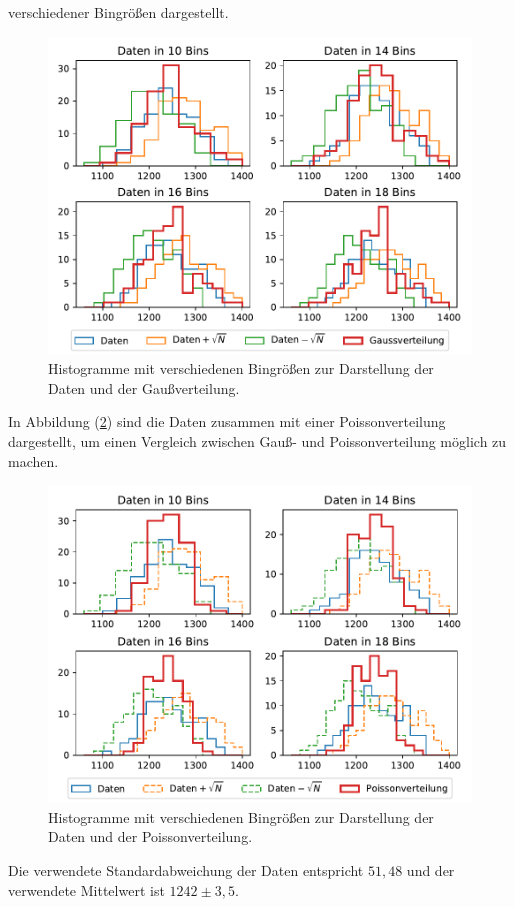 verschiedener Bingrößen dargestellt. 
\begin{figure}[H]
    \centering
    \includegraphics[width=\textwidth]{Plots/plot5.pdf}
    \caption{Histogramme mit verschiedenen Bingrößen zur Darstellung der Daten und der Gaußverteilung.}
    \label{fig:Gauss}
\end{figure}
In Abbildung (\ref{fig:Poisson}) sind die Daten zusammen mit einer Poissonverteilung dargestellt, um einen Vergleich zwischen Gauß- und Poissonverteilung möglich 
zu machen.
\begin{figure}[H]
    \centering
    \includegraphics[width=\textwidth]{Plots/plot6.pdf}
    \caption{Histogramme mit verschiedenen Bingrößen zur Darstellung der Daten und der Poissonverteilung.}
    \label{fig:Poisson}
\end{figure}
Die verwendete Standardabweichung der Daten entspricht $51,48$ und der verwendete Mittelwert ist $1242 \pm 3,5 $. 
